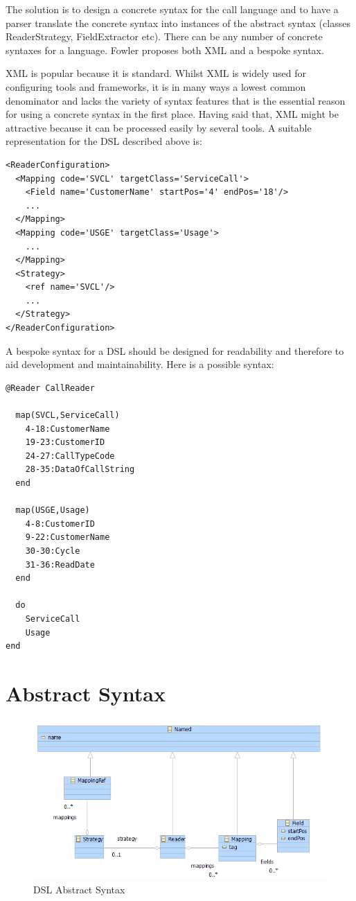 The solution is to design a concrete syntax for the call language and to 
have a parser translate the concrete syntax into instances of the abstract 
syntax (classes ReaderStrategy, FieldExtractor etc). There can be any number 
of concrete syntaxes for a language. Fowler proposes both XML and a bespoke 
syntax.

XML is popular because it is standard. Whilst XML is widely used for 
configuring tools and frameworks, it is in many ways a lowest common 
denominator and lacks the variety of syntax features that is the essential 
reason for using a concrete syntax in the first place. Having said that, 
XML might be attractive because it can be processed easily by several tools. 
A suitable representation for the DSL described above is:
\begin{lstlisting}
<ReaderConfiguration>
  <Mapping code='SVCL' targetClass='ServiceCall'>
    <Field name='CustomerName' startPos='4' endPos='18'/>
    ...
  </Mapping>
  <Mapping code='USGE' targetClass='Usage'>
    ...
  </Mapping>
  <Strategy>
    <ref name='SVCL'/>
    ...
  </Strategy>
</ReaderConfiguration>
\end{lstlisting}
A bespoke syntax for a DSL should be designed for readability and therefore 
to aid development and maintainability. Here is a possible syntax:
\begin{lstlisting}
@Reader CallReader

  map(SVCL,ServiceCall)
    4-18:CustomerName
    19-23:CustomerID
    24-27:CallTypeCode
    28-35:DataOfCallString
  end

  map(USGE,Usage)
    4-8:CustomerID
    9-22:CustomerName
    30-30:Cycle
    31-36:ReadDate
  end

  do 
    ServiceCall
    Usage
end
\end{lstlisting}

\section{Abstract Syntax}

\begin{figure}
\begin{center}
\includegraphics[width=12cm]{LanguageEngineering/DSLs/Images/Readers}
\caption{DSL Abstract Syntax\label{fig:DSLAbstractSyntax}}
\end{center}
\end{figure}

